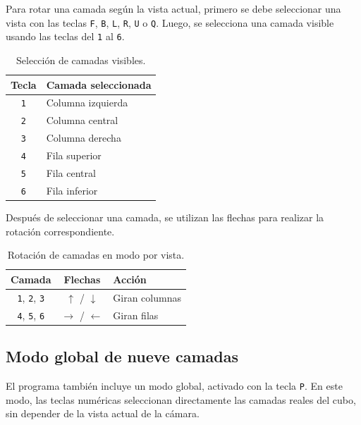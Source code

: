\documentclass[12pt,a4paper]{article}
\begin{document}
Para rotar una camada según la vista actual, primero se debe seleccionar una vista con las teclas \texttt{F}, \texttt{B}, \texttt{L}, \texttt{R}, \texttt{U} o \texttt{Q}. 
Luego, se selecciona una camada visible usando las teclas del \texttt{1} al \texttt{6}.

\begin{table}[H]
\centering
\begin{tabular}{|c|l|}
\hline
\textbf{Tecla} & \textbf{Camada seleccionada} \\ \hline
\texttt{1} & Columna izquierda \\ \hline
\texttt{2} & Columna central \\ \hline
\texttt{3} & Columna derecha \\ \hline
\texttt{4} & Fila superior \\ \hline
\texttt{5} & Fila central \\ \hline
\texttt{6} & Fila inferior \\ \hline
\end{tabular}
\caption{Selección de camadas visibles.}
\end{table}

Después de seleccionar una camada, se utilizan las flechas para realizar la rotación correspondiente.

\begin{table}[H]
\centering
\begin{tabular}{|c|c|l|}
\hline
\textbf{Camada} & \textbf{Flechas} & \textbf{Acción} \\ \hline
\texttt{1}, \texttt{2}, \texttt{3} & $\uparrow$ / $\downarrow$ & Giran columnas \\ \hline
\texttt{4}, \texttt{5}, \texttt{6} & $\rightarrow$ / $\leftarrow$ & Giran filas \\ \hline
\end{tabular}
\caption{Rotación de camadas en modo por vista.}
\end{table}

\subsection{Modo global de nueve camadas}

El programa también incluye un modo global, activado con la tecla \texttt{P}. 
En este modo, las teclas numéricas seleccionan directamente las camadas reales del cubo, sin depender de la vista actual de la cámara.
\end{document}
